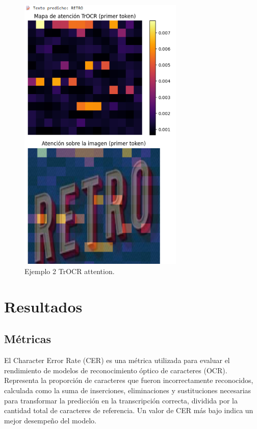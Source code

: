 \documentclass[12pt]{article}
\begin{document}
\begin{figure}[H]
    \centering
    \includegraphics[width=0.7\textwidth]{../reports/figures/attention_heatmap2.png} 
    \caption{Ejemplo 2 TrOCR attention.}
    \label{fig:attention2}
\end{figure}


\section{Resultados}

\subsection{Métricas}

El Character Error Rate (CER) es una métrica utilizada para evaluar el rendimiento 
de modelos de reconocimiento óptico de caracteres (OCR). Representa la proporción
de caracteres que fueron incorrectamente reconocidos, calculada como la suma de 
inserciones, eliminaciones y sustituciones necesarias para transformar la 
predicción en la transcripción correcta, dividida por la cantidad total de 
caracteres de referencia. Un valor de CER más bajo indica un mejor desempeño 
del modelo.
\end{document}
